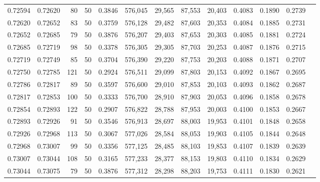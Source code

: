 \begin{tabular}{rrrrrrrrrrrrr}
0.72594 & 0.72620 &    80 &  50 &                                     0.3846 & 576,045 &  29,565 &  87,553 &  20,403 & 0.4083 & 0.1890 & 0.2739 \\
0.72620 & 0.72652 &    83 &  50 &                                     0.3759 & 576,128 &  29,482 &  87,603 &  20,353 & 0.4084 & 0.1885 & 0.2731 \\
0.72652 & 0.72685 &    79 &  50 &                                     0.3876 & 576,207 &  29,403 &  87,653 &  20,303 & 0.4085 & 0.1881 & 0.2724 \\
0.72685 & 0.72719 &    98 &  50 &                                     0.3378 & 576,305 &  29,305 &  87,703 &  20,253 & 0.4087 & 0.1876 & 0.2715 \\
0.72719 & 0.72749 &    85 &  50 &                                     0.3704 & 576,390 &  29,220 &  87,753 &  20,203 & 0.4088 & 0.1871 & 0.2707 \\
0.72750 & 0.72785 &   121 &  50 &                                     0.2924 & 576,511 &  29,099 &  87,803 &  20,153 & 0.4092 & 0.1867 & 0.2695 \\
0.72786 & 0.72817 &    89 &  50 &                                     0.3597 & 576,600 &  29,010 &  87,853 &  20,103 & 0.4093 & 0.1862 & 0.2687 \\
0.72817 & 0.72853 &   100 &  50 &                                     0.3333 & 576,700 &  28,910 &  87,903 &  20,053 & 0.4096 & 0.1858 & 0.2678 \\
0.72854 & 0.72893 &   122 &  50 &                                     0.2907 & 576,822 &  28,788 &  87,953 &  20,003 & 0.4100 & 0.1853 & 0.2667 \\
0.72893 & 0.72926 &    91 &  50 &                                     0.3546 & 576,913 &  28,697 &  88,003 &  19,953 & 0.4101 & 0.1848 & 0.2658 \\
0.72926 & 0.72968 &   113 &  50 &                                     0.3067 & 577,026 &  28,584 &  88,053 &  19,903 & 0.4105 & 0.1844 & 0.2648 \\
0.72968 & 0.73007 &    99 &  50 &                                     0.3356 & 577,125 &  28,485 &  88,103 &  19,853 & 0.4107 & 0.1839 & 0.2639 \\
0.73007 & 0.73044 &   108 &  50 &                                     0.3165 & 577,233 &  28,377 &  88,153 &  19,803 & 0.4110 & 0.1834 & 0.2629 \\
0.73044 & 0.73075 &    79 &  50 &                                     0.3876 & 577,312 &  28,298 &  88,203 &  19,753 & 0.4111 & 0.1830 & 0.2621 \\

\end{tabular}
